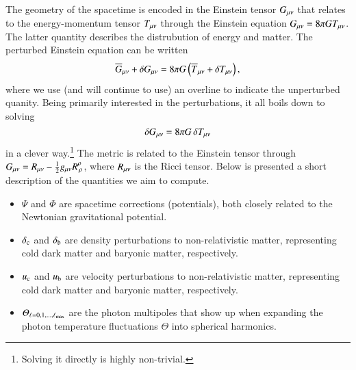 



The geometry of the spacetime is encoded in the Einstein tensor $G_{\mu \nu}$ that relates to the energy-momentum tensor $T_{\mu \nu}$ through the Einstein equation $G_{\mu \nu} = 8\pi G T_{\mu \nu}$. The latter quantity describes the distrubution of energy and matter. The perturbed Einstein equation can be written
\begin{equation}
    \overline{G}_{\mu \nu} +\delta G_{\mu \nu} = 8\pi G \left( \overline{T}_{\mu \nu}+\delta T_{\mu \nu} \right),
\end{equation}
where we use (and will continue to use) an overline to indicate the unperturbed quanity. Being primarily interested in the perturbations, it all boils down to solving
\begin{equation}\label{mil3:theo:eq:delta_G}
    \delta G_{\mu \nu} = 8\pi G\, \delta T_{\mu \nu}
\end{equation}
in a clever way.\footnote{Solving it directly is highly non-trivial.} The metric is related to the Einstein tensor through $G_{\mu \nu}= R_{\mu \nu} - \frac{1}{2}g_{\mu \nu} R^\rho_{\, \rho}$, where $R_{\mu \nu}$ is the Ricci tensor. 
Below is presented a short description of the quantities we aim to compute. 
\begin{itemize}
    \item $\Psi$ and $\Phi$ are spacetime corrections (potentials), both closely related to the Newtonian gravitational potential.
    \item $\delta_\mathrm{c}$ and $\delta_\mathrm{b}$ are density perturbations to non-relativistic matter, representing cold dark matter and baryonic matter, respectively.
    \item $u_\mathrm{c}$ and $u_\mathrm{b}$ are velocity perturbations to non-relativistic matter, representing cold dark matter and baryonic matter, respectively.
    \item $\varTheta_{\ell= 0, 1, \dots, \ell_\mathrm{max}}$ are the photon multipoles that show up when expanding the photon temperature fluctuations $\Theta$ into spherical harmonics.
\end{itemize}

